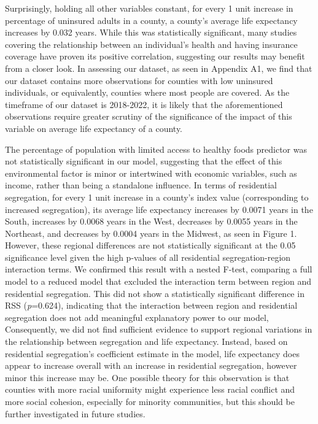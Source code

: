 \documentclass[
  10pt,
  letterpaper,
  DIV=11,
  numbers=noendperiod]{scrartcl}
\begin{document}
Surprisingly, holding all other variables constant, for every 1 unit
increase in percentage of uninsured adults in a county, a county's
average life expectancy increases by 0.032 years. While this was
statistically significant, many studies covering the relationship
between an individual's health and having insurance coverage have proven
its positive correlation, suggesting our results may benefit from a
closer look. In assessing our dataset, as seen in Appendix A1, we find
that our dataset contains more observations for counties with low
uninsured individuals, or equivalently, counties where most people are
covered. As the timeframe of our dataset is 2018-2022, it is likely that
the aforementioned observations require greater scrutiny of the
significance of the impact of this variable on average life expectancy
of a county.~

The percentage of population with limited access to healthy foods
predictor was not statistically significant in our model, suggesting
that the effect of this environmental factor is minor or intertwined
with economic variables, such as income, rather than being a standalone
influence. In terms of residential segregation, for every 1 unit
increase in a county's index value (corresponding to increased
segregation), its average life expectancy increases by 0.0071 years in
the South, increases by 0.0068 years in the West, decreases by 0.0055
years in the Northeast, and decreases by 0.0004 years in the Midwest, as
seen in Figure 1. However, these regional differences are not
statistically significant at the 0.05 significance level given the high
p-values of all residential segregation-region interaction terms. We
confirmed this result with a nested F-test, comparing a full model to a
reduced model that excluded the interaction term between region and
residential segregation. This did not show a statistically significant
difference in RSS (\emph{p}=0.624), indicating that the interaction
between region and residential segregation does not add meaningful
explanatory power to our model, Consequently, we did not find sufficient
evidence to support regional variations in the relationship between
segregation and life expectancy. Instead, based on residential
segregation's coefficient estimate in the model, life expectancy does
appear to increase overall with an increase in residential segregation,
however minor this increase may be. One possible theory for this
observation is that counties with more racial uniformity might
experience less racial conflict and more social cohesion, especially for
minority communities, but this should be further investigated in future
studies.
\end{document}
